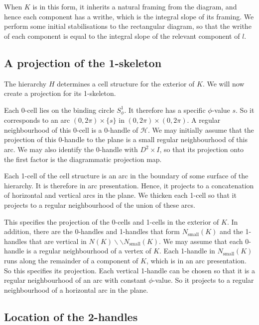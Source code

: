 \documentclass[oneside]{amsart}
\numberwithin{equation}{section}
\theoremstyle{plain}
\theoremstyle{definition}
\newcommand{\cut}{\backslash\backslash}
\newcommand{\calH}{\mathcal{H}}
\begin{document}
When $K$ is in this form, it inherits a natural framing from the diagram, and hence each component
has a writhe, which is the integral slope of its framing. We perform some initial stabilisations to the
rectangular diagram, so that the writhe of each component is equal to the integral slope of the
relevant component of $l$.

\subsection{A projection of the 1-skeleton}
\label{Subsec:Proj1Skel}

The hierarchy $H$ determines a cell structure for the exterior of $K$. We will now create a projection
for its 1-skeleton.

Each 0-cell lies on the binding circle $S^1_\phi$. It therefore has a specific $\phi$-value $s$. So it
corresponds to an arc $(0,2\pi) \times \{ s \}$ in $(0,2\pi) \times (0,2\pi)$. A regular neighbourhood 
of this 0-cell is a 0-handle of $\calH$. We may initially assume that the projection of this 0-handle to
the plane is a small regular neighbourhood of this arc. We may also identify the 0-handle with 
$D^2 \times I$, so that its projection onto the first factor is the diagrammatic projection map.

Each 1-cell of the cell structure is an arc in the boundary of some surface of the hierarchy. It
is therefore in arc presentation. Hence, it projects to a concatenation of horizontal and vertical
arcs in the plane. We thicken each 1-cell so that it projects to a regular neighbourhood of
the union of these arcs.

This specifies the projection of the 0-cells and 1-cells in the exterior of $K$. In addition, there are
the 0-handles and 1-handles that form $N_{\textrm{small}}(K)$ and the 1-handles that are vertical in $N(K) \cut N_{\textrm{small}}(K)$.
We may assume that each 0-handle is a regular neighbourhood of a vertex of $K$. Each 1-handle
in $N_{\textrm{small}}(K)$ runs along the remainder of a component of $K$, which is in an arc presentation.
So this specifies its projection. Each vertical 1-handle can be chosen so that it is a regular neighbourhood
of an arc with constant $\phi$-value. So it projects to a regular neighbourhood of a horizontal arc
in the plane.

\subsection{Location of the 2-handles}
\end{document}
